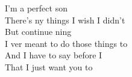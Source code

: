 \songwordfb{}

I'm  a perfect son \\
There's ny things I wish I didn't  \\
But  continue ning \\
I ver meant to do those things to  \\
And  I have to say before I  \\
That I just want you to  \\
 